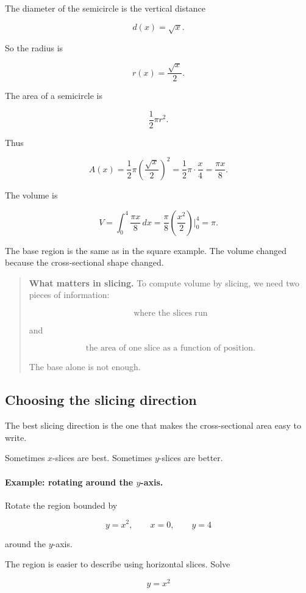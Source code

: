 The diameter of the semicircle is the vertical distance

\[
d(x)=\sqrt{x}.
\]

So the radius is

\[
r(x)=\frac{\sqrt{x}}{2}.
\]

The area of a semicircle is

\[
\frac12\pi r^2.
\]

Thus

\[
A(x)
=
\frac12\pi\left(\frac{\sqrt{x}}{2}\right)^2
=
\frac12\pi\cdot\frac{x}{4}
=
\frac{\pi x}{8}.
\]

The volume is

\[
V=\int_0^4 \frac{\pi x}{8}\,dx
=
\frac{\pi}{8}\left(\frac{x^2}{2}\right)\Big|_0^4
=
\boxed{\pi}.
\]

The base region is the same as in the square example.  The volume changed because the
cross-sectional shape changed.

\begin{quote}
\textbf{What matters in slicing.}
To compute volume by slicing, we need two pieces of information:

\[
\text{where the slices run}
\]

and

\[
\text{the area of one slice as a function of position.}
\]

The base alone is not enough.
\end{quote}

\subsection{Choosing the slicing direction}
\label{subsec:choosing-slicing-direction}

The best slicing direction is the one that makes the cross-sectional area easy to write.

Sometimes \(x\)-slices are best.  Sometimes \(y\)-slices are better.

\paragraph{Example: rotating around the \(y\)-axis.}
Rotate the region bounded by

\[
y=x^2,\qquad x=0,\qquad y=4
\]

around the \(y\)-axis.

The region is easier to describe using horizontal slices.  Solve

\[
y=x^2
\]

